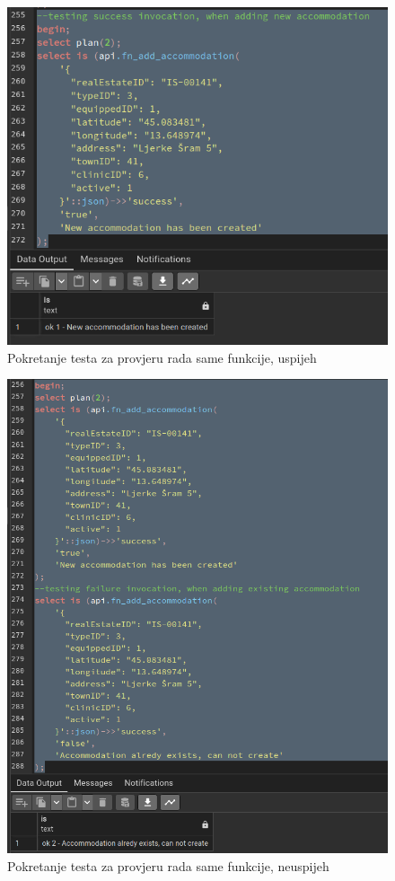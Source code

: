 				\begin{figure}[H]
					\centering
					\includegraphics[width=\textwidth]{slike/unit_tests/ut_4/success_invocation.png}
					\caption{Pokretanje testa za provjeru rada same funkcije, uspijeh}
					\label{fig: IS4-uspješno kreiran smještaj}
				\end{figure}
				\begin{figure}[H]
					\centering
					\includegraphics[width=\textwidth]{slike/unit_tests/ut_4/failure_invocation.png}
					\caption{Pokretanje testa za provjeru rada same funkcije, neuspijeh}
					\label{fig: IS4-smještaj nije kreiran, već postoji isti}
				\end{figure}
